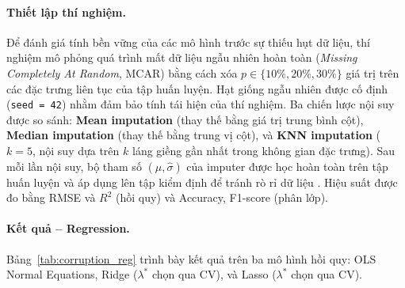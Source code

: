 \paragraph{Thiết lập thí nghiệm.}
Để đánh giá tính bền vững của các mô hình trước sự thiếu hụt dữ liệu,
thí nghiệm mô phỏng quá trình mất dữ liệu ngẫu nhiên hoàn toàn
(\textit{Missing Completely At Random}, MCAR) bằng cách xóa $p \in \{10\%, 20\%, 30\%\}$
giá trị trên các đặc trưng liên tục của tập huấn luyện.
Hạt giống ngẫu nhiên được cố định (\texttt{seed = 42}) nhằm đảm bảo
tính tái hiện của thí nghiệm.
Ba chiến lược nội suy được so sánh:
\textbf{Mean imputation} (thay thế bằng giá trị trung bình cột),
\textbf{Median imputation} (thay thế bằng trung vị cột),
và \textbf{KNN imputation} ($k=5$, nội suy dựa trên $k$ láng giềng gần nhất trong
không gian đặc trưng).
Sau mỗi lần nội suy, bộ tham số $(\hat{\mu}, \hat{\sigma})$ của imputer
được học hoàn toàn trên tập huấn luyện và áp dụng lên tập kiểm định
để tránh rò rỉ dữ liệu .
Hiệu suất được đo bằng RMSE và $R^2$ (hồi quy) và Accuracy, F1-score
(phân lớp).

\paragraph{Kết quả – Regression.}
Bảng~\ref{tab:corruption_reg} trình bày kết quả trên ba mô hình hồi quy:
OLS Normal Equations, Ridge ($\lambda^*$ chọn qua CV), và Lasso ($\lambda^*$ chọn qua CV).

